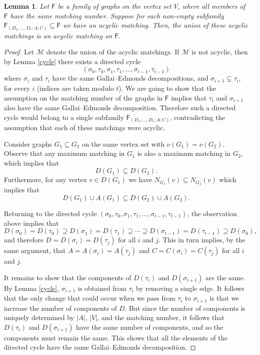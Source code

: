 \documentclass[10pt]{amsart}
\newtheorem{lemma}[thm]{Lemma}
\theoremstyle{definition}
\begin{document}
	\begin{lemma}\label{combine-ge}
		Let $\mathsf{F}$ be a family of graphs on the vertex set $V$, where all members of $\mathsf{F}$ have the same matching number. Suppose for each non-empty subfamily $\mathsf{F}_{(D_1, \dots, D_r;A;C)} \subseteq \mathsf{F}$ we have an acyclic matching. Then, the union of these acyclic matchings is an acyclic matching on $\mathsf{F}$.
	\end{lemma}
	
	\begin{proof}
		Let $\mathcal{M}$ denote the union of the acyclic matchings. If $\mathcal{M}$ is not acyclic, then by Lemma \ref{cycle} there exists a directed cycle 
		\[(\sigma_0, \tau_0, \sigma_1, \tau_1, \dots, \sigma_{t-1}, \tau_{t-1})\]
		where $\sigma_i$ and $\tau_i$ have the same Gallai--Edmonds decompositions, and $\sigma_{i+1} \subsetneq \tau_i$, for every $i$ (indices are taken modulo $t$). We are going to show that the assumption on the matching number of the graphs in $\mathsf{F}$ implies that $\tau_i$ and $\sigma_{i+1}$ also have the same Gallai--Edmonds decomposition. Therefore such a directed cycle would belong to a single subfamily $\mathsf{F}_{(D_1, \dots, D_r; A; C)}$, contradicting the assumption that each of these matchings were acyclic.
		
		\medskip
		
		Consider graphs $G_1\subseteq G_2$ on the same vertex set with $\nu(G_1)=\nu(G_2)$. Observe that any maximum matching in $G_1$ is also a maximum matching in $G_2$, which implies that \[D(G_1)\subseteq D(G_2).\] Furthermore, for any vertex $v\in D(G_1)$ we have $N_{G_1}(v) \subseteq N_{G_2}(v)$ which implies that
		\[D(G_1)\cup A(G_1)\subseteq D(G_2)\cup A(G_2).\]
		
		Returning to the directed cycle $(\sigma_0, \tau_0, \sigma_1, \tau_1, \dots, \sigma_{t-1}, \tau_{t-1})$, the observation above implies that
		\[D(\sigma_0) = D(\tau_0) \supseteq D(\sigma_1) = D(\tau_1) \supseteq \cdots \supseteq D(\sigma_{t-1}) = D(\tau_{t-1}) \supseteq D(\sigma_0),\]
		and therefore $D = D(\sigma_i) = D(\tau_j)$ for all $i$ and $j$. This in turn implies, by the same argument, that $A = A(\sigma_i) = A(\tau_j)$ and $C = C(\sigma_i) = C(\tau_j)$ for all $i$ and $j$.
		
		It remains to show that the components of $D(\tau_i)$ and $D(\sigma_{i+1})$ are the same. By Lemma \ref{cycle},   $\sigma_{i+1}$ is obtained from $\tau_i$ by removing a single edge. It follows that the only change that could occur when we pass from $\tau_i$ to $\sigma_{i+1}$ is that we increase the number of components of $D$. But since the number of components is uniquely determined by $|A|$, $|V|$, and the matching number, it follows that $D(\tau_i)$ and $D(\sigma_{i+1})$ have the same number of components, and so the components must remain the same. This shows that all the elements of the directed cycle have the same Gallai--Edmonds decomposition. 
	\end{proof}
	
\end{document}
